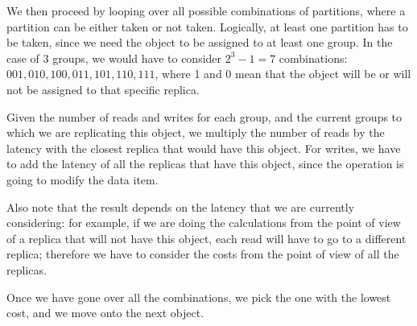 We then proceed by looping over all possible combinations of partitions, where a partition can be either taken or not taken. Logically, at least one partition has to be taken, since we need the object to be assigned to at least one group. In the case of 3 groups, we would have to consider $2^3 -1 = 7$ combinations: $001, 010, 100, 011, 101, 110, 111$, where 1 and 0 mean that the object will be or will not be assigned to that specific replica.

Given the number of reads and writes for each group, and the current groups to which we are replicating this object, we multiply the number of reads by the latency with the closest replica that would have this object. For writes, we have to add the latency of all the replicas that have this object, since the operation is going to modify the data item.

Also note that the result depends on the latency that we are currently considering: for example, if we are doing the calculations from the point of view of a replica that will not have this object, each read will have to go to a different replica; therefore we have to consider the costs from the point of view of all the replicas.

Once we have gone over all the combinations, we pick the one with the lowest cost, and we move onto the next object.

